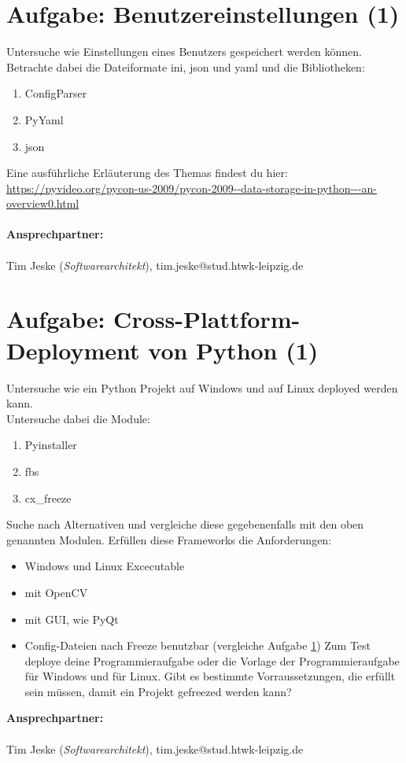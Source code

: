 \documentclass{article}
\begin{document}
\section{Aufgabe: Benutzereinstellungen (1)}\label{sec:usersettings}
Untersuche wie Einstellungen eines Benutzers gespeichert werden können. Betrachte dabei die Dateiformate ini, json und yaml und die Bibliotheken:
\begin{enumerate}
    \item ConfigParser
    \item PyYaml
    \item json
\end{enumerate}
Eine ausführliche Erläuterung des Themas findest du hier:\\ \url{https://pyvideo.org/pycon-us-2009/pycon-2009--data-storage-in-python---an-overview0.html}
\\\\
\textbf{Ansprechpartner:}
\\\\
Tim Jeske (\emph{Softwarearchitekt}), tim.jeske@stud.htwk-leipzig.de

\newpage

\section{Aufgabe: Cross-Plattform-Deployment von Python (1)}
Untersuche wie ein Python Projekt auf Windows und auf Linux deployed werden kann.\\
Untersuche dabei die Module:
\begin{enumerate}
    \item Pyinstaller
    \item fbs
    \item cx\_freeze
\end{enumerate}
Suche nach Alternativen und vergleiche diese gegebenenfalls mit den oben genannten Modulen. Erfüllen diese Frameworks die Anforderungen:
\begin{itemize}
    \item Windows und Linux Excecutable
    \item mit OpenCV
    \item mit GUI, wie PyQt
    \item Config-Dateien nach Freeze benutzbar (vergleiche Aufgabe \ref{sec:usersettings})
Zum Test deploye deine Programmieraufgabe oder die Vorlage der Programmieraufgabe für Windows und für Linux. Gibt es bestimmte Vorraussetzungen, die erfüllt sein müssen, damit ein Projekt gefreezed werden kann?
\end{itemize}
\textbf{Ansprechpartner:}
\\\\
Tim Jeske (\emph{Softwarearchitekt}), tim.jeske@stud.htwk-leipzig.de
\end{document}
